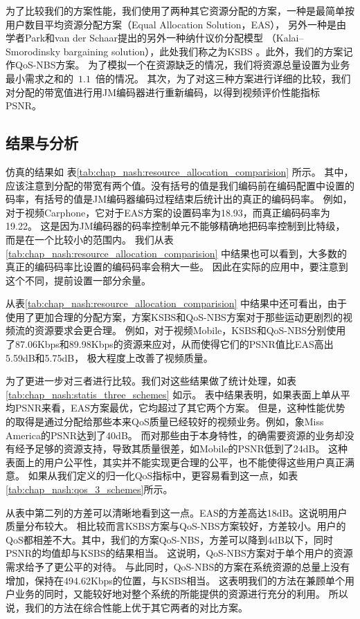 为了比较我们的方案性能，我们使用了两种其它资源分配的方案，一种是最简单按用户数目平均资源分配方案（Equal Allocation Solution，EAS），
另外一种是由学者Park和van der Schaar提出的另外一种纳什议价分配模型 （Kalai–Smorodinsky  bargaining  solution），此处我们称之为KSBS \cite{ParkVanderSchaar2007}。此外，我们的方案记作QoS-NBS方案。
为了模拟一个在资源缺乏的情况，我们将资源总量设置为业务最小需求之和的~$1.1$~倍的情况。
其次，为了对这三种方案进行详细的比较，我们对分配的带宽值进行用JM编码器进行重新编码，以得到视频评价性能指标 PSNR。

\subsection{结果与分析}
仿真的结果如 表\ref{tab:chap_nash:resource_allocation_comparision} 所示。
其中，应该注意到分配的带宽有两个值。没有括号的值是我们编码前在编码配置中设置的码率，有括号的值是JM编码器编码过程结束后统计出的真正的编码码率。
例如，对于视频Carphone，它对于EAS方案的设置码率为18.93，而真正编码码率为19.22。
这是因为JM编码器的码率控制单元不能够精确地把码率控制到比特级，而是在一个比较小的范围内。
我们从表\ref{tab:chap_nash:resource_allocation_comparision} 中结果也可以看到，大多数的真正的编码码率比设置的编码码率会稍大一些。
因此在实际的应用中，要注意到这个不同，提前设置一部分余量。

从表\ref{tab:chap_nash:resource_allocation_comparision} 中结果中还可看出，由于使用了更加合理的分配方案，方案KSBS和QoS-NBS方案对于那些运动更剧烈的视频流的资源要求会更合理。
例如，对于视频Mobile，KSBS和QoS-NBS分别使用了87.06Kbps和89.98Kbps的资源来应对，从而使得它们的PSNR值比EAS高出5.59dB和5.75dB，
极大程度上改善了视频质量。

为了更进一步对三者进行比较。我们对这些结果做了统计处理，如表\ref{tab:chap_nash:statis_three_schemes} 如示。
表中结果表明，如果表面上单从平均PSNR来看，EAS方案最优，它均超过了其它两个方案。
但是，这种性能优势的取得是通过分配给那些本来QoS质量已经较好的视频业务。例如，象Miss America的PSNR达到了40dB。
而对那些由于本身特性，的确需要资源的业务却没有经予足够的资源支持，导致其质量很差，如Mobile的PSNR低到了24dB。
这种表面上的用户公平性，其实并不能实现更合理的公平，也不能使得这些用户真正满意。
如果从我们定义的归一化QoS指标中，更容易看到这一点，如表\ref{tab:chap_nash:qos_3_schemes}所示。


从表中第二列的方差可以清晰地看到这一点。EAS的方差高达18dB。这说明用户质量分布较大。
相比较而言KSBS方案与QoS-NBS方案较好，方差较小。用户的QoS都相差不大。其中，我们的方案QoS-NBS，方差可以降到4dB以下，同时PSNR的均值却与KSBS的结果相当。
这说明，QoS-NBS方案对于单个用户的资源需求给予了更公平的对待。
与此同时，QoS-NBS的方案在系统资源的总量上没有增加，保持在494.62Kbps的位置，与KSBS相当。
这表明我们的方法在兼顾单个用户业务的同时，又能较好地对整个系统的所能提供的资源进行充分的利用。
所以说，我们的方法在综合性能上优于其它两者的对比方案。

